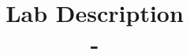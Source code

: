 

\title[\cisxxx-\weekno: \topicshort]{
	Lab Description\\
	\cisxxx-\weekno\\
	~\\
	{\Large 
		\topic
	}\\
}

\author{
	\myauthor\\
	\hbTimeStamp
}



\maketitle

\tableofcontents
